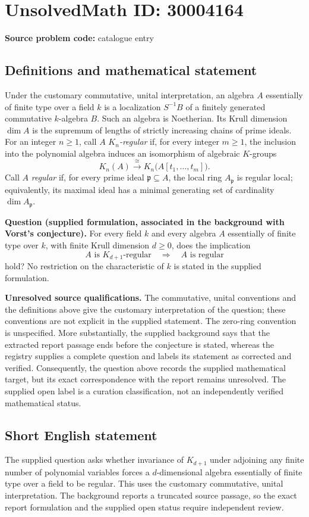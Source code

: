 \documentclass[11pt]{article}
\begin{document}
\section*{UnsolvedMath ID: 30004164}
\textbf{Source problem code:} catalogue entry
\subsection{Definitions and mathematical statement}
Under the customary commutative, unital interpretation, an algebra $A$ essentially of finite type over a field $k$ is a localization $S^{-1}B$ of a finitely generated commutative $k$-algebra $B$. Such an algebra is Noetherian. Its Krull dimension $\dim A$ is the supremum of lengths of strictly increasing chains of prime ideals. For an integer $n\geq 1$, call $A$ \emph{$K_n$-regular} if, for every integer $m\geq 1$, the inclusion into the polynomial algebra induces an isomorphism of algebraic $K$-groups
\[
K_n(A)\xrightarrow{\;\cong\;}K_n\bigl(A[t_1,\ldots,t_m]\bigr).
\]
Call $A$ \emph{regular} if, for every prime ideal $\mathfrak p\subseteq A$, the local ring $A_{\mathfrak p}$ is regular local; equivalently, its maximal ideal has a minimal generating set of cardinality $\dim A_{\mathfrak p}$.

\textbf{Question (supplied formulation, associated in the background with Vorst's conjecture).} For every field $k$ and every algebra $A$ essentially of finite type over $k$, with finite Krull dimension $d\geq 0$, does the implication
\[
A\text{ is }K_{d+1}\text{-regular}
\quad\Longrightarrow\quad
A\text{ is regular}
\]
hold? No restriction on the characteristic of $k$ is stated in the supplied formulation.

\textbf{Unresolved source qualifications.} The commutative, unital conventions and the definitions above give the customary interpretation of the question; these conventions are not explicit in the supplied statement. The zero-ring convention is unspecified. More substantially, the supplied background says that the extracted report passage ends before the conjecture is stated, whereas the registry supplies a complete question and labels its statement as corrected and verified. Consequently, the question above records the supplied mathematical target, but its exact correspondence with the report remains unresolved. The supplied open label is a curation classification, not an independently verified mathematical status.
\subsection{Short English statement}
The supplied question asks whether invariance of $K_{d+1}$ under adjoining any finite number of polynomial variables forces a $d$-dimensional algebra essentially of finite type over a field to be regular. This uses the customary commutative, unital interpretation. The background reports a truncated source passage, so the exact report formulation and the supplied open status require independent review.
\end{document}
